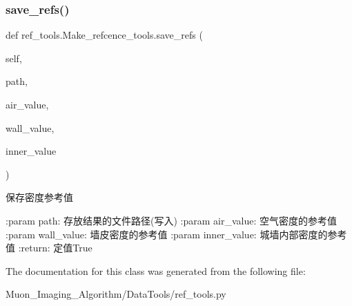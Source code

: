 \subsubsection{\texorpdfstring{save\+\_\+refs()}{save\_refs()}}
{\footnotesize\ttfamily def ref\+\_\+tools.\+Make\+\_\+refcence\+\_\+tools.\+save\+\_\+refs (\begin{DoxyParamCaption}\item[{}]{self,  }\item[{}]{path,  }\item[{}]{air\+\_\+value,  }\item[{}]{wall\+\_\+value,  }\item[{}]{inner\+\_\+value }\end{DoxyParamCaption})}

\begin{DoxyVerb}保存密度参考值

:param path: 存放结果的文件路径(写入)
:param air_value: 空气密度的参考值
:param wall_value: 墙皮密度的参考值
:param inner_value: 城墙内部密度的参考值
:return: 定值True
\end{DoxyVerb}
 

The documentation for this class was generated from the following file\+:\begin{DoxyCompactItemize}
\item 
Muon\+\_\+\+Imaging\+\_\+\+Algorithm/\+Data\+Tools/ref\+\_\+tools.\+py\end{DoxyCompactItemize}
